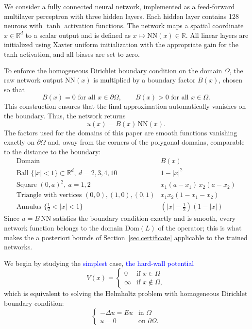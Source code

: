 \documentclass[10pt]{amsart}
\newcommand{\rev}[1]{\textcolor{blue}{#1}}
\newenvironment{revblock}{\color{blue}}{}
\theoremstyle{definition}
\theoremstyle{remark}
\theoremstyle{plain}
\newcommand{\R}{\mathbb{R}}
\begin{document}
We consider a fully connected neural network, implemented as a feed-forward multilayer perceptron with three hidden layers. Each hidden layer contains 128 neurons with $\tanh$ activation functions. The network maps a spatial coordinate $x\in \R^d$ to a scalar output and is defined as $
x \mapsto \text{NN}(x) \in \mathbb{R}$. All linear layers are initialized using Xavier uniform initialization with the appropriate gain for the tanh activation, and all biases are set to zero.

To enforce the homogeneous Dirichlet boundary condition on the domain $\Omega$, the raw network output $\text{NN}(x)$ is multiplied by a boundary factor $B(x)$, chosen so that
$$
B(x)=0 \text{ for all } x\in\partial\Omega, \qquad B(x)>0 \text{ for all } x\in\Omega.
$$
This construction ensures that the final approximation automatically vanishes on the boundary. Thus, the network returns
$$
u(x)=B(x)\,\text{NN}(x).
$$
\begin{revblock}
The factors used for the domains of this paper are smooth functions vanishing exactly on
$\partial\Omega$ and, away from the corners of the polygonal domains, comparable to the distance to
the boundary:
\[
\begin{array}{ll}
\text{Domain} & B(x)\\ \hline
\text{Ball } \{|x|<1\}\subset\R^d,\ d=2,3,4,10 & 1-|x|^2\\
\text{Square } (0,a)^2,\ a=1,2 & x_1(a-x_1)\,x_2(a-x_2)\\
\text{Triangle with vertices } (0,0),(1,0),(0,1) & x_1x_2(1-x_1-x_2)\\
\text{Annulus } \{\tfrac12<|x|<1\} & (|x|-\tfrac12)(1-|x|)
\end{array}
\]
Since $u=B\,\mathrm{NN}$ satisfies the boundary condition exactly and is smooth, every network
function belongs to the domain $\mathrm{Dom}(L)$ of the operator; this is what makes the a posteriori bounds of
Section~\ref{sec.certificate} applicable to the trained networks.
\end{revblock}

We begin by studying the \rev{simplest} case, \rev{the hard-wall potential}
\begin{equation}\label{conf.V}
V(x) = \begin{cases}
0 & \text{if } x\in \Omega\\
\infty & \text{if } x\not\in \Omega,
\end{cases}
\end{equation}
which is equivalent to solving the Helmholtz problem with homogeneous Dirichlet boundary condition:
\begin{equation}\label{eigen2}
\begin{cases}
-\Delta u = E u & \text{in }\Omega\\
u=0 & \text{on }\partial\Omega.
\end{cases}
\end{equation}
\end{document}

